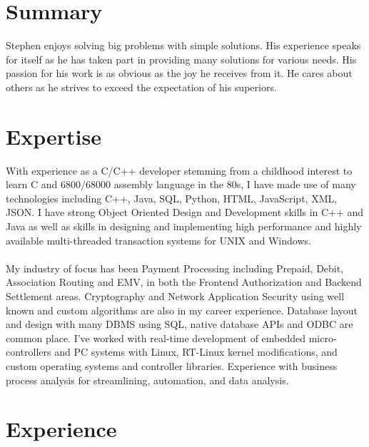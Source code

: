 \documentclass[11pt,letterpaper,sans,english]{moderncv}        %
\begin{document}
\makecvtitle
\section{Summary}
Stephen enjoys solving big problems with simple solutions. His experience speaks for itself as he has taken part in providing many solutions for various needs. His passion for his work is as obvious as the joy he receives from it. He cares about others as he strives to exceed the expectation of his superiors.
\section{Expertise}
With experience as a C/C++ developer stemming from a childhood interest to learn C and 6800/68000 assembly language in the 80s, I have made use of many technologies including C++, Java, SQL, Python, HTML, JavaScript, XML, JSON.  I have strong Object Oriented Design and Development skills in C++ and Java as well as skills in designing and implementing high performance and highly available multi-threaded transaction systems for UNIX and Windows. \\
\\
My industry of focus has been Payment Processing including Prepaid, Debit, Association Routing and EMV, in both the Frontend Authorization and Backend Settlement areas. Cryptography and Network Application Security using well known and custom algorithms are also in my career experience. Database layout and design with many DBMS using SQL, native database APIs and ODBC are common place. I've worked with real-time development of embedded micro-controllers and PC systems with Linux, RT-Linux kernel modifications, and custom operating systems and controller libraries. Experience with business process analysis for streamlining, automation, and data analysis.

\section{Experience}
\end{document}
